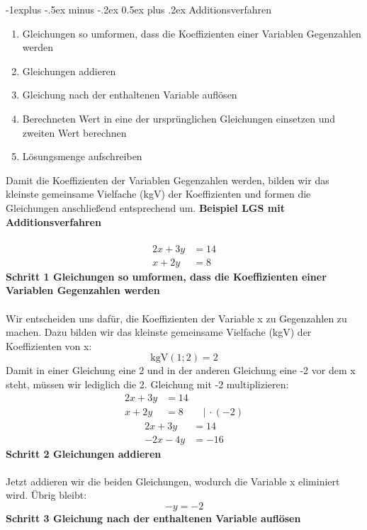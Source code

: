 \documentclass[10pt,landscape]{article}
\makeatletter
\renewcommand{\subsection}{\@startsection{subsection}{2}{0mm}%
                                {-1explus -.5ex minus -.2ex}%
                                {0.5ex plus .2ex}%
                                {\normalfont\normalsize\bfseries}}
\makeatother
\begin{document}
\begin{multicols}{3}
    \subsection{Additions­verfahren}
    \begin{enumerate}
        \item     Gleichungen so umformen, dass die Koeffizienten einer Variablen Gegenzahlen werden
        \item     Gleichungen addieren
        \item     Gleichung nach der enthaltenen Variable auflösen
        \item     Berechneten Wert in eine der ursprünglichen Gleichungen einsetzen und zweiten Wert berechnen
        \item     Lösungsmenge aufschreiben
    \end{enumerate}
    Damit die Koeffizienten der Variablen Gegenzahlen werden, bilden wir das kleinste gemeinsame Vielfache (kgV) der Koeffizienten und formen die Gleichungen anschließend entsprechend um.
    \textbf{Beispiel LGS mit Additionsverfahren}\\~\\
    \begin{align*} 2x + 3y &= 14 \\ x + 2y &= 8 \end{align*}
    \textbf{Schritt 1 Gleichungen so umformen, dass die Koeffizienten einer Variablen Gegenzahlen werden}\\~\\
    Wir entscheiden uns dafür, die Koeffizienten der Variable x zu Gegenzahlen zu machen. Dazu bilden wir das kleinste gemeinsame Vielfache (kgV) der Koeffizienten von x:
    \[\text{kgV}(1;2) = 2\]
    Damit in einer Gleichung eine 2 und in der anderen Gleichung eine -2 vor dem x steht, müssen wir lediglich die 2. Gleichung mit -2 multiplizieren:
    \begin{align*} 2x + 3y &= 14 \\ x + 2y &= 8 \qquad |\, \cdot (-2) \end{align*}
    \begin{align*} 2x + 3y &= 14 \\ -2x - 4y &= -16 \end{align*}
    \newpage
    \textbf{Schritt 2 Gleichungen addieren}\\~\\
    Jetzt addieren wir die beiden Gleichungen, wodurch die Variable x eliminiert wird. Übrig bleibt:
    \[-y = -2\]
    \textbf{Schritt 3 Gleichung nach der enthaltenen Variable auflösen}\\~\\

\end{multicols}
\end{document}
